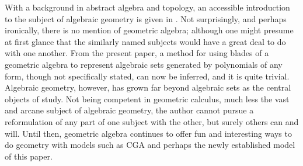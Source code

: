 \documentclass{birkjour}
\theoremstyle{definition}
\theoremstyle{remark}
\numberwithin{equation}{section}
\begin{document}
With a background in abstract algebra and topology, an accessible
introduction to the subject of algebraic geometry is given in \cite{Milne12}.
Not surprisingly, and perhaps ironically, there is no mention of geometric algebra; although
one might presume at first glance that the similarly named subjects would have a great deal to do
with one another.  From the present paper, a method for using blades of a geometric
algebra to represent algebraic sets generated by polynomials of any form, though not specifically stated,
can now be inferred, and it is quite trivial.  Algebraic geometry, however, has grown far beyond
algebraic sets as the central objects of study.  Not being competent in geometric calculus,
much less the vast and arcane subject of algebraic geometry, the author cannot pursue
a reformulation of any part of one subject with the other, but surely others can and will.
Until then, geometric algebra continues to offer fun and interesting ways to do geometry
with models such as CGA and perhaps the newly established model of this paper.

\nocite{Dorst07}
\nocite{Sobczyk12}



\end{document}
